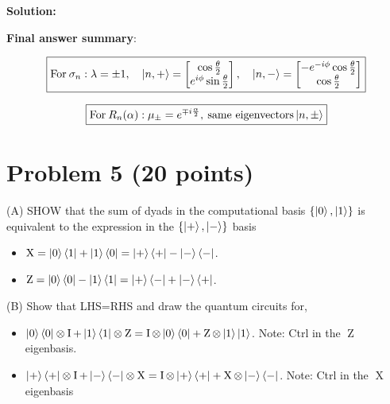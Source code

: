 \documentclass[11pt]{article}
\newenvironment{solution}
{\par\noindent\textbf{Solution:}\par}
{\vspace{1em}}
\begin{document}
\begin{solution}
\textbf{Final answer summary}:

\[\boxed{\text{For} \: \sigma_n: \lambda = \pm 1, \quad \ket{n,+} = \begin{bmatrix}\cos{\frac{\theta}{2}} \\ e^{i\phi}\sin{\frac{\theta}{2}}\end{bmatrix}, \quad \ket{n,-} = \begin{bmatrix}-e^{-i\phi}\cos{\frac{\theta}{2}} \\ \cos{\frac{\theta}{2}}\end{bmatrix}}\]

\[\boxed{\text{For} \: R_n(\alpha): \mu_{\pm} = e^{\mp i\frac{\alpha}{2}}, \: \text{same eigenvectors} \ket{n,\pm}}\]

\end{solution}

\section*{Problem 5 (20 points)}

(A) SHOW that the sum of dyads in the computational basis $\{\ket{0},\ket{1}\}$ is equivalent to the expression in the $\{\ket{+},\ket{-}\}$ basis
\begin{itemize}
    \item $\operatorname{X} = \ket{0}\bra{1} + \ket{1}\bra{0} = \ket{+}\bra{+} - \ket{-}\bra{-}$.
    \item $\operatorname{Z} = \ket{0}\bra{0} - \ket{1}\bra{1} = \ket{+}\bra{-} + \ket{-}\bra{+}$.
\end{itemize}
(B)  Show that LHS=RHS and draw the quantum circuits for,
\begin{itemize}
    \item $\ket{0}\bra{0} \otimes \operatorname{I} + \ket{1}\bra{1} \otimes \operatorname{Z} = \operatorname{I} \otimes \ket{0}\bra{0} + \operatorname{Z} \otimes \ket{1}\ket{1}$. Note: Ctrl in the $\operatorname{Z}$ eigenbasis.
    \item $\ket{+}\bra{+} \otimes \operatorname{I} +\ket{-}\bra{-} \otimes \operatorname{X} = \operatorname{I} \otimes \ket{+}\bra{+} + \operatorname{X} \otimes \ket{-}\bra{-}$. Note: Ctrl in the $\operatorname{X}$ eigenbasis
\end{itemize}
\end{document}
